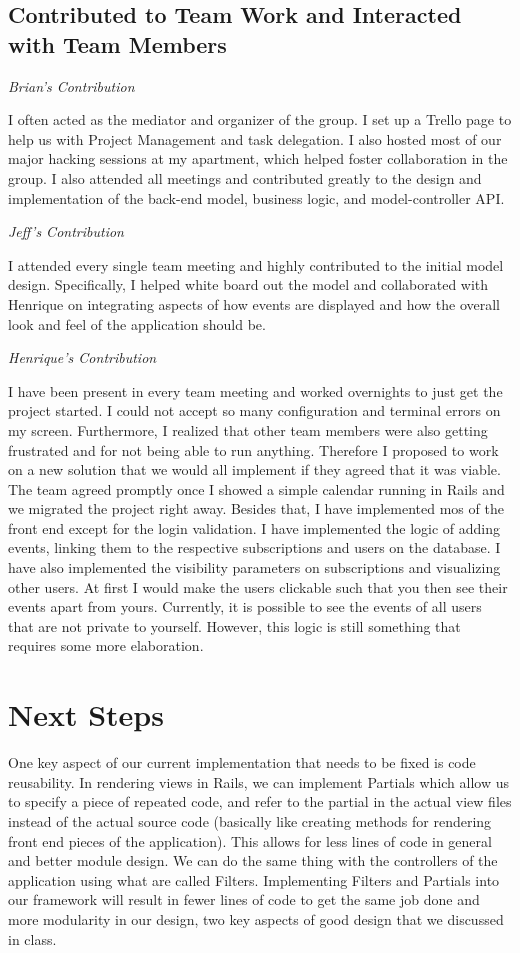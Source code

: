\documentclass[11pt]{article}
\begin{document}
\subsection{Contributed to Team Work and Interacted with Team Members}

\textit{Brian's Contribution}

I often acted as the mediator and organizer of the group. I set up a Trello page to help us with Project Management and task delegation. I also hosted most of our major hacking sessions at my apartment, which helped foster collaboration in the group. I also attended all meetings and contributed greatly to the design and implementation of the back-end model, business logic, and model-controller API. 

\textit{Jeff's Contribution}

I attended every single team meeting and highly contributed to the initial model design.  Specifically, I helped white board out the model and collaborated with Henrique on integrating aspects of how events are displayed and how the overall look and feel of the application should be.

\textit{Henrique's Contribution}

I have been present in every team meeting and worked overnights to just get the project started. I could not accept so many configuration and terminal errors on my screen. Furthermore, I realized that other team members were also getting frustrated and for not being able to run anything. Therefore I proposed to work on a new solution that we would all implement if they agreed that it was viable. The team agreed promptly once I showed a simple calendar running in Rails and we migrated the project right away. Besides that, I have implemented mos of the front end except for the login validation. I have implemented the logic of adding events, linking them to the respective subscriptions and users on the database. I have also implemented the visibility parameters on subscriptions and visualizing other users. At first I would make the users clickable such that you then see their events apart from yours. Currently, it is possible to see the events of all users that are not private to yourself. However, this logic is still something that requires some more elaboration.

\section{Next Steps}

One key aspect of our current implementation that needs to be fixed is code reusability.  In rendering views in Rails, we can implement Partials which allow us to specify a piece of repeated code, and refer to the partial in the actual view files instead of the actual source code (basically like creating methods for rendering front end pieces of the application).  This allows for less lines of code in general and better module design.  We can do the same thing with the controllers of the application using what are called Filters.  Implementing Filters and Partials into our framework will result in fewer lines of code to get the same job done and more modularity in our design, two key aspects of good design that we discussed in class.
\end{document}
